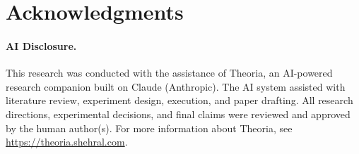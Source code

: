\documentclass{article}
\begin{document}

\section*{Acknowledgments}


\paragraph{AI Disclosure.}
This research was conducted with the assistance of Theoria, an AI-powered research companion built on Claude (Anthropic). The AI system assisted with literature review, experiment design, execution, and paper drafting. All research directions, experimental decisions, and final claims were reviewed and approved by the human author(s). For more information about Theoria, see \url{https://theoria.shehral.com}.



\end{document}
